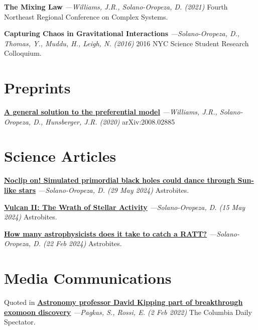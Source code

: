 \documentclass[a4paper,11pt]{article}
\begin{document}
    \textbf{The Mixing Law} \textit{—Williams, J.R., Solano-Oropeza, D. (2021)} Fourth Northeast Regional Conference on Complex Systems.
    \vspace{1.5mm}
    
    \textbf{Capturing Chaos in Gravitational Interactions} \textit{—Solano-Oropeza, D., Thomas, Y., Muddu, H., Leigh, N. (2016)} 2016 NYC Science Student Research Colloquium.
    
\section{Preprints}
    {\href{https://arxiv.org/abs/2008.02885}{\textbf{A general solution to the preferential model}}} \textit{—Williams, J.R., Solano-Oropeza, D., Hunsberger, J.R. (2020)} arXiv:2008.02885

\section{Science Articles}

    {\href{https://astrobites.org/2024/05/29/noclip-on-simulated-primordial-black-holes-could-dance-through-sun-like-stars/}{\textbf{Noclip on! Simulated primordial black holes could dance through Sun-like stars}}} \textit{—Solano-Oropeza, D. (29 May 2024)} Astrobites.
    \vspace{1.5mm}

    {\href{https://astrobites.org/2024/02/22/how-many-astrophysicists-does-it-take-to-catch-a-ratt/}{\textbf{Vulcan II: The Wrath of Stellar Activity}}} \textit{—Solano-Oropeza, D. (15 May 2024)} Astrobites.
    \vspace{1.5mm}

    {\href{https://astrobites.org/2024/02/22/how-many-astrophysicists-does-it-take-to-catch-a-ratt/}{\textbf{How many astrophysicists does it take to catch a RATT?}}} \textit{—Solano-Oropeza, D. (22 Feb 2024)} Astrobites.
    \vspace{1.5mm}
    
\section{Media Communications}
    Quoted in {\href{https://www.columbiaspectator.com/news/2022/02/02/astronomy-professor-david-kipping-part-of-breakthrough-exomoon-discovery/}{\textbf{Astronomy professor David Kipping part of breakthrough exomoon discovery}}} \textit{—Pagkas, S., Rossi, E. (2 Feb 2022)} The Columbia Daily Spectator.
\end{document}
